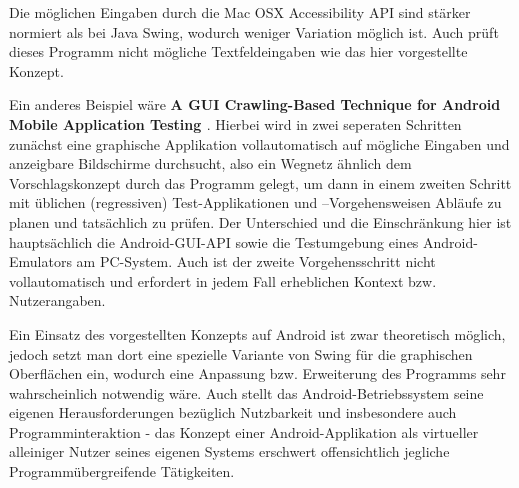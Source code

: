 Die möglichen Eingaben durch die \glqq{}Mac OSX Accessibility API\grqq{} sind stärker normiert als bei
Java Swing, wodurch weniger Variation möglich ist. Auch prüft dieses Programm nicht mögliche
Textfeldeingaben wie das hier vorgestellte Konzept.

\vspace{1cm}

Ein anderes Beispiel wäre \textbf{\glqq{}A GUI Crawling-Based Technique for Android Mobile Application
Testing\grqq{} \cite{AGCBTFAMAT}}. Hierbei wird in zwei seperaten Schritten zunächst eine graphische Applikation
vollautomatisch auf mögliche Eingaben und anzeigbare Bildschirme durchsucht, also ein
\glqq{}Wegnetz\grqq{} ähnlich dem Vorschlagskonzept durch das Programm gelegt, um dann in einem zweiten
Schritt mit üblichen (regressiven) Test-Applikationen und –Vorgehensweisen Abläufe zu
planen und tatsächlich zu prüfen. Der Unterschied und die Einschränkung hier ist
hauptsächlich die Android-GUI-API sowie die Testumgebung eines Android-Emulators am
PC-System. Auch ist der zweite Vorgehensschritt nicht vollautomatisch und erfordert in jedem Fall
erheblichen Kontext bzw. Nutzerangaben.

Ein Einsatz des vorgestellten Konzepts auf Android ist zwar theoretisch möglich, jedoch setzt
man dort eine spezielle Variante von Swing für die graphischen Oberflächen ein, 
wodurch eine Anpassung bzw. Erweiterung des Programms sehr wahrscheinlich notwendig wäre. 
Auch stellt das Android-Betriebssystem seine eigenen Herausforderungen
bezüglich Nutzbarkeit und insbesondere auch Programminteraktion - das Konzept
einer Android-Applikation als virtueller alleiniger Nutzer seines eigenen Systems
erschwert offensichtlich jegliche Programmübergreifende Tätigkeiten.
